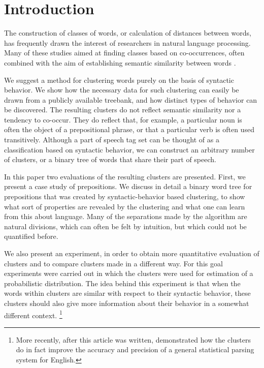 



\maketitle


\section{Introduction}

The construction of classes of words, or calculation of distances between words,
has frequently drawn the interest of researchers in natural language processing.
Many of these studies aimed at finding classes based on co-occurrences, often
combined with the aim of establishing semantic similarity between words
\cite{mcmahon96,brown:clust,dagan:context,dagan:sym,pereira:distr,gref:adj}.

We suggest a method for clustering words purely on the basis of syntactic
behavior. We show how the necessary data for such clustering can easily be drawn
from a publicly available treebank, and how distinct types of behavior can be
discovered. The resulting clusters do not reflect semantic similarity nor a
tendency to co-occur. They do reflect that, for example, a particular noun is
often the object of a prepositional phrase, or that a particular verb is often
used transitively. Although a part of speech tag set can be thought of as a
classification based on syntactic behavior, we can construct an arbitrary number
of clusters, or a binary tree of words that share their part of speech.

In this paper two evaluations of the resulting clusters are presented. First, we
present a case study of prepositions. We discuss in detail a binary word tree
for prepositions that was created by syntactic-behavior based clustering, to
show what sort of properties are revealed by the clustering and what one can
learn from this about language. Many of the separations made by the algorithm
are natural divisions, which can often be felt by intuition, but which could not
be quantified before.

We also present an experiment, in order to obtain more quantitative
evaluation of clusters and to compare clusters made in a different
way.  For this goal experiments were carried out in which the clusters
were used for estimation of a probabilistic distribution. The idea
behind this experiment is that when the words within clusters are
similar with respect to their syntactic behavior, these clusters
should also give more information about their behavior in a somewhat
different context. \footnote{More recently, after this article was written,
\cite{ik:phd} demonstrated how the clusters do in fact
improve the accuracy and precision of a general statistical parsing
system for English.}

